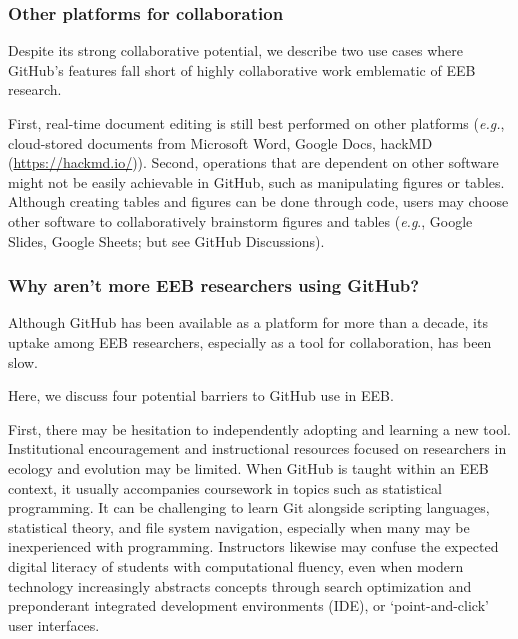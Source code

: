 \hypertarget{other-platforms-for-collaboration}{%
\subsubsection{Other platforms for collaboration}\label{other-platforms-for-collaboration}}

Despite its strong collaborative potential, we describe two use cases where GitHub's features fall short of highly collaborative work emblematic of EEB research.

First, real-time document editing is still best performed on other platforms (\emph{e.g.}, cloud-stored documents from Microsoft Word, Google Docs, hackMD (\url{https://hackmd.io/})).
Second, operations that are dependent on other software might not be easily achievable in GitHub, such as manipulating figures or tables.
Although creating tables and figures can be done through code, users may choose other software to collaboratively brainstorm figures and tables (\emph{e.g}., Google Slides, Google Sheets; but see GitHub Discussions).

\hypertarget{why-arent-more-eeb-researchers-using-github}{%
\subsubsection{Why aren't more EEB researchers using GitHub?}\label{why-arent-more-eeb-researchers-using-github}}

Although GitHub has been available as a platform for more than a decade, its uptake among EEB researchers, especially as a tool for collaboration, has been slow.

Here, we discuss four potential barriers to GitHub use in EEB.

First, there may be hesitation to independently adopting and learning a new tool.
Institutional encouragement and instructional resources focused on researchers in ecology and evolution may be limited.
When GitHub is taught within an EEB context, it usually accompanies coursework in topics such as statistical programming.
It can be challenging to learn Git alongside scripting languages, statistical theory, and file system navigation, especially when many may be inexperienced with programming.
Instructors likewise may confuse the expected digital literacy of students with computational fluency, even when modern technology increasingly abstracts concepts through search optimization and preponderant integrated development environments (IDE), or `point-and-click' user interfaces.

